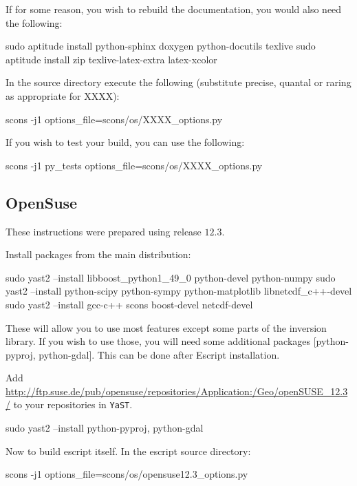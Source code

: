 \begin{optionalstep}
If for some reason, you wish to rebuild the documentation, you would also need the following:
\begin{shellCode}
sudo aptitude install python-sphinx doxygen python-docutils texlive 
sudo aptitude install zip texlive-latex-extra latex-xcolor 
\end{shellCode}
\end{optionalstep}

\noindent In the source directory execute the following (substitute precise, quantal or raring as appropriate for XXXX):
\begin{shellCode}
scons -j1 options_file=scons/os/XXXX_options.py
\end{shellCode}

\noindent If you wish to test your build, you can use the following:
\begin{shellCode}
scons -j1 py_tests options_file=scons/os/XXXX_options.py 
\end{shellCode}



\subsection{OpenSuse}\label{sec:susesrc}
These instructions were prepared using release $12.3$.

\noindent Install packages from the main distribution:
\begin{shellCode}
sudo yast2 --install libboost_python1_49_0 python-devel python-numpy 
sudo yast2 --install python-scipy python-sympy python-matplotlib libnetcdf_c++-devel
sudo yast2 --install gcc-c++ scons boost-devel netcdf-devel
\end{shellCode}
These will allow you to use most features except some parts of the \downunder inversion library.
If you wish to use those, you will need some additional packages [python-pyproj, python-gdal].
This can be done after Escript installation.

\begin{optionalstep}
Add \url{http://ftp.suse.de/pub/opensuse/repositories/Application:/Geo/openSUSE_12.3/}
to your repositories in \texttt{YaST}.
\begin{shellCode}
sudo yast2 --install python-pyproj, python-gdal
\end{shellCode}
\end{optionalstep}

Now to build escript itself.
In the escript source directory:
\begin{shellCode}
scons -j1 options_file=scons/os/opensuse12.3_options.py
\end{shellCode}

